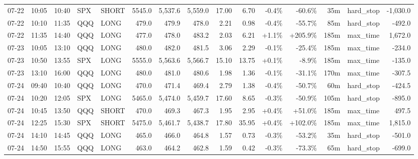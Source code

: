 \documentclass[11pt,a4paper,twoside]{article}
\begin{document}
\begin{landscape}
\begin{center}
\begin{longtable}{>{\color{txtmain}}l l l l l r r r r r r r r >{\color{txtmain}}l r}
07-22 & 10:05 & 10:40 & SPX & SHORT & 5545.0 & 5,537.6 & 5,559.0 & 17.00 & 6.70 & \textcolor{lossred}{-0.4\%} & \textcolor{lossred}{-60.6\%} & 35m & hard\_stop & \textcolor{lossred}{-1,030.0} \\
07-22 & 10:10 & 11:35 & QQQ & LONG & 479.0 & 479.9 & 478.0 & 2.21 & 0.98 & \textcolor{lossred}{-0.4\%} & \textcolor{lossred}{-55.7\%} & 85m & hard\_stop & \textcolor{lossred}{-492.0} \\
07-22 & 11:35 & 14:40 & QQQ & LONG & 477.0 & 478.0 & 483.2 & 2.03 & 6.21 & \textcolor{wingreen}{+1.1\%} & \textcolor{wingreen}{+205.9\%} & 185m & max\_time & \textcolor{wingreen}{1,672.0} \\
07-23 & 10:05 & 13:10 & QQQ & LONG & 480.0 & 482.0 & 481.5 & 3.06 & 2.29 & \textcolor{lossred}{-0.1\%} & \textcolor{lossred}{-25.4\%} & 185m & max\_time & \textcolor{lossred}{-234.0} \\
07-23 & 10:50 & 13:55 & SPX & LONG & 5555.0 & 5,563.6 & 5,566.7 & 15.10 & 13.75 & \textcolor{wingreen}{+0.1\%} & \textcolor{lossred}{-8.9\%} & 185m & max\_time & \textcolor{lossred}{-135.0} \\
07-23 & 13:10 & 16:00 & QQQ & LONG & 480.0 & 481.0 & 480.6 & 1.98 & 1.36 & \textcolor{lossred}{-0.1\%} & \textcolor{lossred}{-31.1\%} & 170m & max\_time & \textcolor{lossred}{-307.5} \\
07-24 & 09:40 & 10:40 & QQQ & LONG & 470.0 & 471.4 & 469.4 & 2.79 & 1.38 & \textcolor{lossred}{-0.4\%} & \textcolor{lossred}{-50.7\%} & 60m & hard\_stop & \textcolor{lossred}{-424.5} \\
07-24 & 10:20 & 12:05 & SPX & LONG & 5465.0 & 5,474.0 & 5,459.7 & 17.60 & 8.65 & \textcolor{lossred}{-0.3\%} & \textcolor{lossred}{-50.9\%} & 105m & hard\_stop & \textcolor{lossred}{-895.0} \\
07-24 & 10:45 & 13:50 & QQQ & SHORT & 470.0 & 469.3 & 467.3 & 1.95 & 2.95 & \textcolor{wingreen}{+0.4\%} & \textcolor{wingreen}{+51.0\%} & 185m & max\_time & \textcolor{wingreen}{497.5} \\
07-24 & 12:25 & 15:30 & SPX & SHORT & 5475.0 & 5,461.7 & 5,438.7 & 17.80 & 35.95 & \textcolor{wingreen}{+0.4\%} & \textcolor{wingreen}{+102.0\%} & 185m & max\_time & \textcolor{wingreen}{1,815.0} \\
07-24 & 14:10 & 14:45 & QQQ & LONG & 465.0 & 466.0 & 464.8 & 1.57 & 0.73 & \textcolor{lossred}{-0.3\%} & \textcolor{lossred}{-53.2\%} & 35m & hard\_stop & \textcolor{lossred}{-501.0} \\
07-24 & 14:50 & 15:55 & QQQ & LONG & 463.0 & 464.2 & 462.8 & 1.59 & 0.42 & \textcolor{lossred}{-0.3\%} & \textcolor{lossred}{-73.3\%} & 65m & hard\_stop & \textcolor{lossred}{-699.0} \\

\end{longtable}
\end{center}
\end{landscape}
\end{document}
